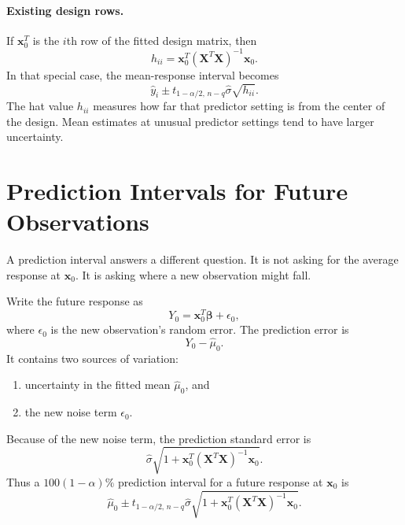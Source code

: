 \paragraph{Existing design rows.}
If \(\mathbf{x}_0^T\) is the \(i\)th row of the fitted design matrix, then
\begin{equation}
  h_{ii}=\mathbf{x}_0^T(\mathbf{X}^T\mathbf{X})^{-1}\mathbf{x}_0.
\end{equation}
In that special case, the mean-response interval becomes
\begin{equation}
  \widehat{y}_i
  \pm
  t_{1-\alpha/2,\,n-q}\widehat{\sigma}\sqrt{h_{ii}}.
\end{equation}
The hat value \(h_{ii}\) measures how far that predictor setting is from the center of the design.  Mean estimates at unusual predictor settings tend to have larger uncertainty.

\section{Prediction Intervals for Future Observations}

A prediction interval answers a different question.  It is not asking for the average response at \(\mathbf{x}_0\).  It is asking where a new observation might fall.

Write the future response as
\begin{equation}
  Y_0=\mathbf{x}_0^T\boldsymbol{\beta}+\epsilon_0,
\end{equation}
where \(\epsilon_0\) is the new observation's random error.  The prediction error is
\begin{equation}
  Y_0-\widehat{\mu}_0.
\end{equation}
It contains two sources of variation:
\begin{enumerate}
  \item uncertainty in the fitted mean \(\widehat{\mu}_0\), and
  \item the new noise term \(\epsilon_0\).
\end{enumerate}
Because of the new noise term, the prediction standard error is
\begin{equation}
  \widehat{\sigma}
  \sqrt{1+\mathbf{x}_0^T(\mathbf{X}^T\mathbf{X})^{-1}\mathbf{x}_0}.
\end{equation}
Thus a \(100(1-\alpha)\%\) prediction interval for a future response at \(\mathbf{x}_0\) is
\begin{equation}
  \boxed{
  \widehat{\mu}_0
  \pm
  t_{1-\alpha/2,\,n-q}\widehat{\sigma}
  \sqrt{1+\mathbf{x}_0^T(\mathbf{X}^T\mathbf{X})^{-1}\mathbf{x}_0}.
  }
  \label{eq:ch13-prediction-interval}
\end{equation}

